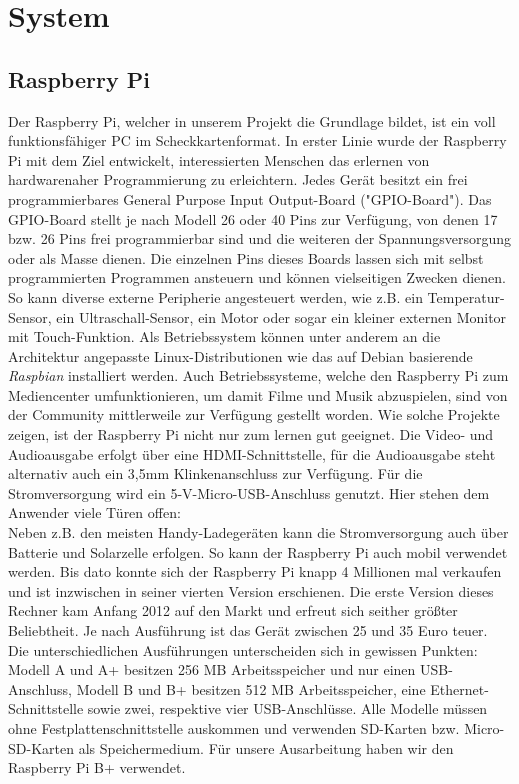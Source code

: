 \documentclass[journal]{IEEEtran}
\begin{document}
\section{System}
\subsection{Raspberry Pi}
Der Raspberry Pi, welcher in unserem Projekt die Grundlage bildet, ist ein voll funktionsfähiger PC im Scheckkartenformat. In erster Linie wurde der Raspberry Pi mit dem Ziel entwickelt, interessierten Menschen das erlernen von hardwarenaher Programmierung zu erleichtern. Jedes Gerät besitzt ein frei programmierbares General Purpose Input Output-Board ("GPIO-Board"). Das GPIO-Board stellt je nach Modell 26 oder 40 Pins zur Verfügung, von denen 17 bzw. 26 Pins frei programmierbar sind und die weiteren der Spannungsversorgung oder als Masse dienen. Die einzelnen Pins dieses Boards lassen sich mit selbst programmierten Programmen ansteuern und können vielseitigen Zwecken dienen. So kann diverse externe Peripherie angesteuert werden, wie z.B. ein Temperatur-Sensor, ein Ultraschall-Sensor, ein Motor oder sogar ein kleiner externen Monitor mit Touch-Funktion. Als Betriebssystem können unter anderem an die Architektur angepasste Linux-Distributionen wie das auf Debian basierende \textit{Raspbian} installiert werden.  Auch Betriebssysteme, welche den Raspberry Pi zum Mediencenter umfunktionieren, um damit Filme und Musik abzuspielen, sind von der Community mittlerweile zur Verfügung gestellt worden. Wie solche Projekte zeigen, ist der Raspberry Pi nicht nur zum lernen gut geeignet. Die Video- und Audioausgabe erfolgt über eine HDMI-Schnittstelle, für die Audioausgabe steht alternativ auch ein 3,5mm Klinkenanschluss zur Verfügung. Für die Stromversorgung wird ein 5-V-Micro-USB-Anschluss genutzt. Hier stehen dem Anwender viele Türen offen: \\ Neben z.B. den meisten Handy-Ladegeräten kann die Stromversorgung auch über Batterie und Solarzelle erfolgen. So kann der Raspberry Pi auch mobil verwendet werden. Bis dato konnte sich der Raspberry Pi knapp 4 Millionen mal verkaufen und ist inzwischen in seiner vierten Version erschienen. \cite{verkaufszahlen} Die erste Version dieses Rechner kam Anfang 2012 auf den Markt und erfreut sich seither größter Beliebtheit. Je nach Ausführung ist das Gerät zwischen 25 und 35 Euro teuer. Die unterschiedlichen Ausführungen unterscheiden sich in gewissen Punkten: \\ Modell A und A+ besitzen 256 MB Arbeitsspeicher und nur einen USB-Anschluss, Modell B und B+ besitzen 512 MB Arbeitsspeicher, eine Ethernet-Schnittstelle sowie zwei, respektive vier USB-Anschlüsse. Alle Modelle müssen ohne Festplattenschnittstelle auskommen und verwenden SD-Karten  bzw. Micro-SD-Karten als Speichermedium. Für unsere Ausarbeitung haben wir den Raspberry Pi B+ verwendet.\\
\end{document}
